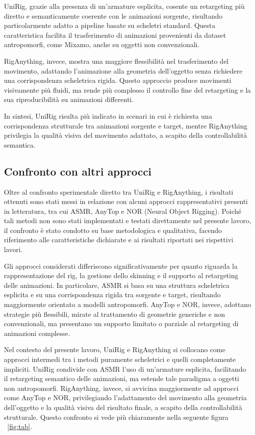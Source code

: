 UniRig, grazie alla presenza di un'armature esplicita, cosente un retargeting più diretto e semanticamente coerente con le animazioni sorgente, risultando particolarmente adatto a pipeline basate su scheletri standard. Questa caratteristica facilita il trasferimento di animazioni provenienti da dataset antropomorfi, come Mixamo, anche su oggetti non convenzionali.

RigAnything, invece, mostra una maggiore flessibilità nel trasferimento del movimento, adattando l'animazione alla geometria dell'oggetto senza richiedere una corrispondenza scheletrica rigida. Questo approccio produce movimenti visivamente più fluidi, ma rende più complesso il controllo fine del retargeting e la sua riproducibilità su animazioni differenti.

In sintesi, UniRig risulta più indicato in scenari in cui è richiesta una corrispondenza strutturale tra animazioni sorgente e target, mentre RigAnything privilegia la qualità visiva del movimento adattato, a scapito della controllabilità semantica.

\subsection{Confronto con altri approcci}

Oltre al confronto sperimentale diretto tra UniRig e RigAnything, i risultati ottenuti sono stati messi in relazione con alcuni approcci rappresentativi presenti in letteratura, tra cui ASMR, AnyTop e NOR (Neural Object Rigging).
Poiché tali metodi non sono stati implementati e testati direttamente nel presente lavoro, il confronto è stato condotto su base metodologica e qualitativa, facendo riferimento alle caratteristiche dichiarate e ai risultati riportati nei rispettivi lavori.

Gli approcci considerati differiscono significativamente per quanto riguarda la rappresentazione del rig, la gestione dello skinning e il supporto al retargeting delle animazioni. In particolare, ASMR si basa su una struttura scheletrica esplicita e su una corrispondenza rigida tra sorgente e target, risultando maggiormente orientato a modelli antropomorfi. AnyTop e NOR, invece, adottano strategie più flessibili, mirate al trattamento di geometrie generiche e non convenzionali, ma presentano un supporto limitato o parziale al retargeting di animazioni complesse.

Nel contesto del presente lavoro, UniRig e RigAnything si collocano come approcci intermedi tra i metodi puramente scheletrici e quelli completamente impliciti. UniRig condivide con ASMR l’uso di un’armature esplicita, facilitando il retargeting semantico delle animazioni, ma estende tale paradigma a oggetti non antropomorfi. RigAnything, invece, si avvicina maggiormente ad approcci come AnyTop e NOR, privilegiando l’adattamento del movimento alla geometria dell’oggetto e la qualità visiva del risultato finale, a scapito della controllabilità strutturale. Questo confronto si vede più chiaramente nella seguente figura ~\ref{fig:tab}.

